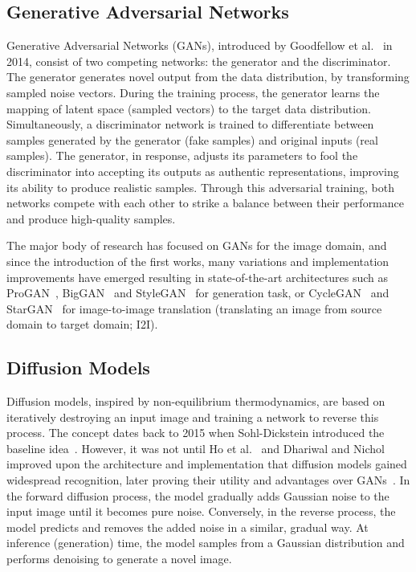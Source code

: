 \documentclass[conference,table]{IEEEtran} %
\begin{document}
\subsection{Generative Adversarial Networks}
Generative Adversarial Networks (GANs), introduced by Goodfellow et al.~\cite{goodfellow_generative_2014} in 2014, consist of two competing networks: the generator and the discriminator. 
The generator generates novel output from the data distribution, by transforming sampled noise vectors. During the training process, the generator learns the mapping of latent space (sampled vectors) to the target data distribution.
Simultaneously, a discriminator network is trained to differentiate between samples generated by the generator (fake samples) and original inputs (real samples). 
The generator, in response, adjusts its parameters to fool the discriminator into accepting its outputs as authentic representations, improving its ability to produce realistic samples. 
Through this adversarial training, both networks compete with each other to strike a balance between their performance and produce high-quality samples. 

The major body of research has focused on GANs for the image domain, and since the introduction of the first works, many variations and implementation improvements have emerged resulting in state-of-the-art architectures such as ProGAN~\cite{karras_progressive_2018}, BigGAN~\cite{brock_large_2019} and StyleGAN~\cite{karras_style-based_2019} for generation task, or CycleGAN~\cite{zhu_unpaired_2020} and StarGAN~\cite{choi_stargan_2018} for image-to-image translation (translating an image from source domain to target domain; I2I).

\subsection{Diffusion Models}
Diffusion models, inspired by non-equilibrium thermodynamics, are based on iteratively destroying an input image and training a network to reverse this process. The concept dates back to 2015 when Sohl-Dickstein introduced the baseline idea~\cite{sohl-dickstein_deep_2015}. However, it was not until Ho et al.~\cite{ho_denoising_2020} and Dhariwal and Nichol~\cite{nichol_improved_2021} improved upon the architecture and implementation that diffusion models gained widespread recognition, later proving their utility and advantages over GANs~\cite{dhariwal_diffusion_2021}.
In the forward diffusion process, the model gradually adds Gaussian noise to the input image until it becomes pure noise. Conversely, in the reverse process, the model predicts and removes the added noise in a similar, gradual way. At inference (generation) time, the model samples from a Gaussian distribution and performs denoising to generate a novel image.
\end{document}
